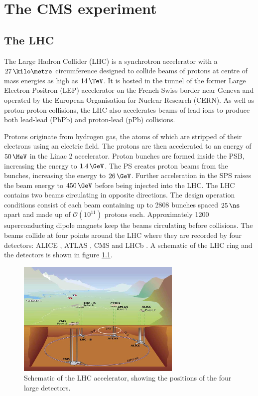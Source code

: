 \chapter{The CMS experiment}
\label{chap:detector}

\section{The LHC}
\label{sec:theLHC}

The Large Hadron Collider (LHC) \cite{theLHC} is a synchrotron accelerator
with a $27\,\kilo\metre$ circumference designed to
collide beams of protons at centre of mass energies as high as $14\,\TeV$. It is
hosted in the tunnel of the former Large Electron Positron (LEP)
\cite{LEP:1983aa} accelerator on the French-Swiss border
near Geneva and operated by the European Organisation for Nuclear Research
(CERN). As well as proton-proton collisions, the LHC also accelerates beams of
lead ions to produce both lead-lead (PbPb) and proton-lead (pPb) collisions.

Protons originate from hydrogen gas, the atoms of which are stripped of
their electrons using an electric field. The protons are then accelerated to an
energy of $50\,\MeV$ in the Linac 2 accelerator. Proton bunches are formed inside
the \ac{PSB}, increasing the energy to $1.4\,\GeV$. The \ac{PS} creates proton
beams from the bunches, increasing the energy to $26\,\GeV$. Further acceleration
in the \ac{SPS} raises the beam energy to $450\,\GeV$ before being injected into
the LHC. The LHC contains two beams circulating in opposite directions. The
design operation conditions consist of each beam containing up to 2808 bunches
spaced $25\,\ns$ apart and made up of $\mathcal{O}(10^{11})$ protons each. 
Approximately 1200 superconducting dipole magnets keep the beams circulating
before collisions. The beams collide at four points around the LHC where they
are recorded by four detectors: ALICE \cite{Aamodt:2008zz}, ATLAS
\cite{Aad:2008zzm}, CMS \cite{Chatrchyan:2008aa} and LHCb \cite{Alves:2008zz}. A
schematic of the LHC ring and the detectors is shown in figure
\ref{fig:LHCschematic}.

\begin{figure}[htbp]
   \includegraphics[width=0.7\textwidth]{plots/detector/LHC_layout_sch.jpg}
\caption{Schematic of the LHC accelerator, showing the positions of the four
large detectors.}
\label{fig:LHCschematic}
\end{figure}

